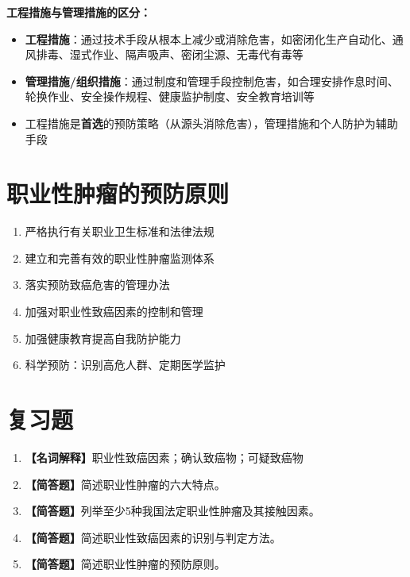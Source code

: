 \begin{exambox}
\textbf{工程措施与管理措施的区分：}
\begin{itemize}[leftmargin=*]
    \item \textbf{工程措施}：通过技术手段从根本上减少或消除危害，如密闭化生产自动化、通风排毒、湿式作业、隔声吸声、密闭尘源、无毒代有毒等
    \item \textbf{管理措施/组织措施}：通过制度和管理手段控制危害，如合理安排作息时间、轮换作业、安全操作规程、健康监护制度、安全教育培训等
    \item 工程措施是\textbf{首选}的预防策略（从源头消除危害），管理措施和个人防护为辅助手段
\end{itemize}
\end{exambox}

\section{职业性肿瘤的预防原则}

\begin{enumerate}[leftmargin=*]
    \item 严格执行有关职业卫生标准和法律法规
    \item 建立和完善有效的职业性肿瘤监测体系
    \item 落实预防致癌危害的管理办法
    \item 加强对职业性致癌因素的控制和管理
    \item 加强健康教育提高自我防护能力
    \item 科学预防：识别高危人群、定期医学监护
\end{enumerate}

\section{复习题}

\begin{enumerate}[leftmargin=*, itemsep=8pt]
    \item \textbf{【名词解释】}职业性致癌因素；确认致癌物；可疑致癌物
    \item \textbf{【简答题】}简述职业性肿瘤的六大特点。
    \item \textbf{【简答题】}列举至少5种我国法定职业性肿瘤及其接触因素。
    \item \textbf{【简答题】}简述职业性致癌因素的识别与判定方法。
    \item \textbf{【简答题】}简述职业性肿瘤的预防原则。
\end{enumerate}

